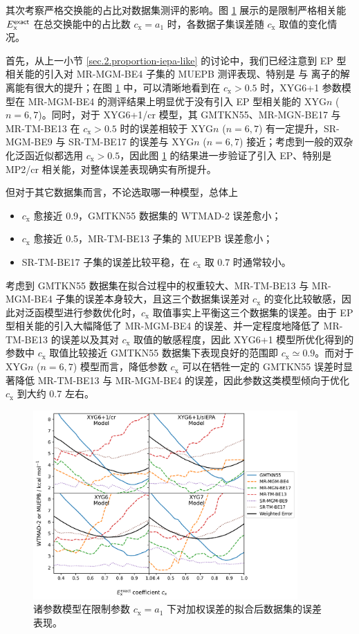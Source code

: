 其次考察严格交换能的占比对数据集测评的影响。图 \ref{fig.2.plot-seq} 展示的是限制严格相关能 $E_\mathrm{x}^{\textsf{exact}}$ 在总交换能中的占比数 $c_\mathrm{x} = a_1$ 时，各数据子集误差随 $c_\mathrm{x}$ 取值的变化情况。

首先，从上一小节 \ref{sec.2.proportion-iepa-like} 的讨论中，我们已经注意到 EP 型相关能的引入对 MR-MGM-BE4 子集的 MUEPB 测评表现、特别是  与  离子的解离能有很大的提升；在图 \ref{fig.2.plot-seq} 中，可以清晰地看到在 $c_\mathrm{x} > 0.5$ 时，XYG6+1 参数模型在 MR-MGM-BE4 的测评结果上明显优于没有引入 EP 型相关能的 XYG$n$ ($n=6,7$)。同时，对于 XYG6+1/cr 模型，其 GMTKN55、MR-MGN-BE17 与 MR-TM-BE13 在 $c_\mathrm{x} > 0.5$ 时的误差相较于 XYG$n$ ($n=6,7$) 有一定提升，SR-MGM-BE9 与 SR-TM-BE17 的误差与 XYG$n$ ($n=6,7$) 接近；考虑到一般的双杂化泛函近似都选用 $c_\mathrm{x} > 0.5$，因此图 \ref{fig.2.plot-seq} 的结果进一步验证了引入 EP、特别是 MP2/cr 相关能，对整体误差表现确实有所提升。

但对于其它数据集而言，不论选取哪一种模型，总体上
\begin{itemize}[nosep]
  \item $c_\mathrm{x}$ 愈接近 0.9，GMTKN55 数据集的 WTMAD-2 误差愈小；
  \item $c_\mathrm{x}$ 愈接近 0.5，MR-TM-BE13 子集的 MUEPB 误差愈小；
  \item SR-TM-BE17 子集的误差比较平稳，在 $c_\mathrm{x}$ 取 0.7 时通常较小。
\end{itemize}
考虑到 GMTKN55 数据集在拟合过程中的权重较大、MR-TM-BE13 与 MR-MGM-BE4 子集的误差本身较大，且这三个数据集误差对 $c_\mathrm{x}$ 的变化比较敏感，因此对泛函模型进行参数优化时，$c_\mathrm{x}$ 取值事实上平衡这三个数据集的误差。由于 EP 型相关能的引入大幅降低了 MR-MGM-BE4 的误差、并一定程度地降低了 MR-TM-BE13 的误差以及其对 $c_\mathrm{x}$ 取值的敏感程度，因此 XYG6+1 模型所优化得到的参数中 $c_\mathrm{x}$ 取值比较接近 GMTKN55 数据集下表现良好的范围即 $c_\mathrm{x} \simeq 0.9$。而对于 XYG$n$ ($n=6,7$) 模型而言，降低参数 $c_\mathrm{x}$ 可以在牺牲一定的 GMTKN55 误差时显著降低 MR-TM-BE13 与 MR-MGM-BE4 的误差，因此参数这类模型倾向于优化 $c_\mathrm{x}$ 到大约 0.7 左右。

\begin{figure}[h]
  \centering
  \includegraphics[width=0.9\textwidth]{assets/plot-seq.pdf}
  \caption{诸参数模型在限制参数 $c_\mathrm{x} = a_1$ 下对加权误差的拟合后数据集的误差表现。}
  \label{fig.2.plot-seq}
\end{figure}

